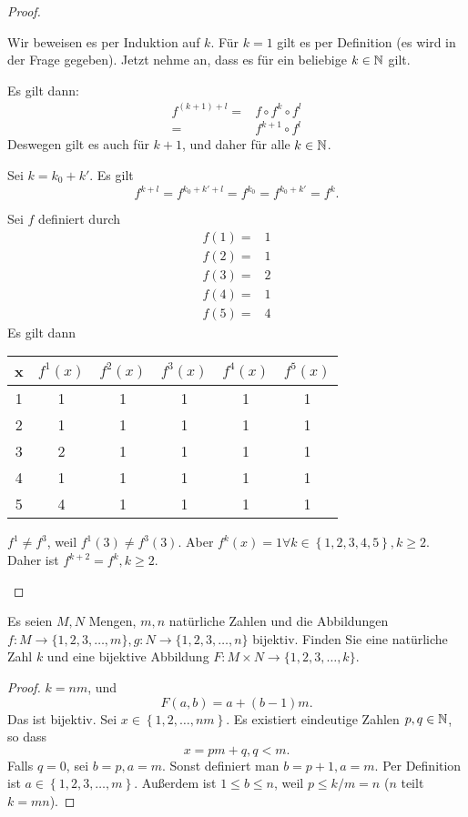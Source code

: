 \begin{proof}
	\begin{parts}
	\item Wir beweisen es per Induktion auf $k$. F\"{u}r $k=1$ gilt es per Definition (es wird in der Frage gegeben). Jetzt nehme an, dass es f\"{u}r ein beliebige $k\in\mathbb{N}$ gilt. 
	
		Es gilt dann:
		\begin{align*}
			f^{(k+1)+l}=&f\circ f^k\circ f^l\\
			=& f^{k+1}\circ f^l
		\end{align*}
		Deswegen gilt es auch f\"{u}r $k+1$, und daher f\"{u}r alle $k\in \mathbb{N}$.
	\item Sei $k=k_0+k'$. Es gilt
		\[
			f^{k+l}=f^{k_0+k'+l}=f^{k_0}=f^{k_0+k'}=f^k
		.\] 
	\item Sei $f$ definiert durch
		\begin{align*}
			f(1)=&1\\
			f(2)=&1\\
			f(3)=&2\\
			f(4)=&1\\
			f(5)=&4
		\end{align*}
		Es gilt dann
		\begin{center}
			\begin{tabular}{cccccc}
				\toprule
				x & $f^1(x)$ & $f^2(x)$ & $f^3(x)$ & $f^4(x)$ & $f^5(x)$\\\midrule
				1 & 1 & 1 & 1 & 1 & 1\\\midrule
				2 & 1 & 1 & 1 & 1 & 1\\\midrule
				3 & 2 & 1 & 1 & 1 & 1\\\midrule
				4 & 1 & 1 & 1 & 1 & 1\\\midrule
				5 & 4 & 1 & 1 & 1 & 1\\\bottomrule
			\end{tabular}
		\end{center}
		$f^1\neq f^3$, weil $f^1(3)\neq f^3(3)$. Aber $f^k(x)=1\forall k \in \left\{ 1,2,3,4,5 \right\} , k\ge 2$. Daher ist $f^{k+2}=f^k, k\ge 2$.\qedhere
	\end{parts}
\end{proof}
\begin{Problem}
	Es seien $M, N$ Mengen, $m, n$ nat\"{u}rliche Zahlen und die Abbildungen $f : M \to \{1, 2, 3, \dots , m\}, g : N \to \{1, 2, 3,\dots , n\}$ bijektiv. Finden Sie eine nat\"{u}rliche Zahl $k$ und eine bijektive Abbildung $F : M \times  N \to \{1, 2, 3, \dots , k\}$.
\end{Problem}
\begin{proof}
	$k=nm$, und
	\[
	F(a,b)=a+(b-1)m
	.\] 
	Das ist bijektiv. Sei $x\in\left\{ 1,2,\dots,nm \right\} $. Es existiert eindeutige Zahlen $p,q\in\mathbb{N}$, so dass
	\[
	x=pm+q, q<m
	.\] 
	Falls $q=0$, sei $b=p,a=m$. Sonst definiert man $b=p+1,a=m$. Per Definition ist $a\in \left\{ 1,2,3,\dots,m \right\} $. Außerdem ist $1\le b\le n$, weil $p\le k / m=n$ ($n$ teilt $k=mn$).
\end{proof}
